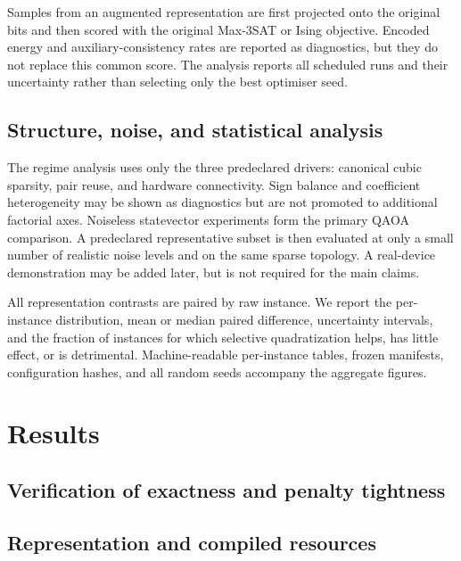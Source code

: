 \documentclass[a4paper,onecolumn,11pt,unpublished]{quantumarticle}
\newcommand{\blankcontent}{\noindent\mbox{}\par}
\theoremstyle{remark}
\begin{document}
Samples from an augmented representation are first projected onto the original
bits and then scored with the original Max-3SAT or Ising objective.  Encoded
energy and auxiliary-consistency rates are reported as diagnostics, but they do
not replace this common score.  The analysis reports all scheduled runs and
their uncertainty rather than selecting only the best optimiser seed.

\subsection{Structure, noise, and statistical analysis}
\label{sec:structure-noise-protocol}

The regime analysis uses only the three predeclared drivers: canonical cubic
sparsity, pair reuse, and hardware connectivity.  Sign balance and coefficient
heterogeneity may be shown as diagnostics but are not promoted to additional
factorial axes.  Noiseless statevector experiments form the primary QAOA
comparison.  A predeclared representative subset is then evaluated at only a
small number of realistic noise levels and on the same sparse topology.  A
real-device demonstration may be added later, but is not required for the main
claims.

All representation contrasts are paired by raw instance.  We report the
per-instance distribution, mean or median paired difference, uncertainty
intervals, and the fraction of instances for which selective quadratization
helps, has little effect, or is detrimental.  Machine-readable per-instance
tables, frozen manifests, configuration hashes, and all random seeds accompany
the aggregate figures.

\section{Results}
\label{sec:results}

\subsection{Verification of exactness and penalty tightness}
\blankcontent

\subsection{Representation and compiled resources}
\blankcontent
\end{document}
